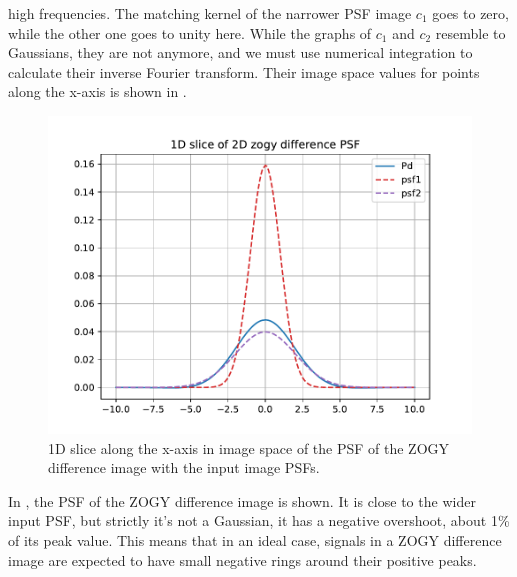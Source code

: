 \documentclass[11pt]{article}
\begin{document}
high frequencies. The matching kernel of the narrower PSF image \(c_1\) goes
to zero, while the other one goes to unity here. While the graphs of \(c_1\)
and \(c_2\) resemble to Gaussians, they are not anymore, and we must use
numerical integration to calculate their inverse Fourier transform. Their
image space values for points along the x-axis is shown in
.
%
\begin{figure}
\begin{center}
\includegraphics[width=5.5in]{fig/zogy_theo_Gaussians_img_Pd.pdf}
\end{center}
\caption{\label{fig:theo_Gaussians_img_Pd}1D slice along the x-axis in image
  space of the PSF of the ZOGY difference image with the input image PSFs.}
\end{figure}
%
\par In , the PSF of the ZOGY difference
  image is shown. It is close to the wider input PSF, but strictly it's not
  a Gaussian, it has a negative overshoot, about 1\% of its peak
  value. This means that in an ideal case, signals in a ZOGY difference
  image are expected to have small negative rings around their positive
  peaks.
%
\end{document}
